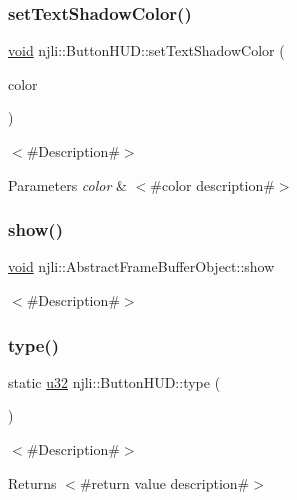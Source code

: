 \subsubsection{\texorpdfstring{set\+Text\+Shadow\+Color()}{setTextShadowColor()}}
{\footnotesize\ttfamily \mbox{\hyperlink{_thread_8h_af1e856da2e658414cb2456cb6f7ebc66}{void}} njli\+::\+Button\+H\+U\+D\+::set\+Text\+Shadow\+Color (\begin{DoxyParamCaption}\item[{const bt\+Vector4 \&}]{color }\end{DoxyParamCaption})}

$<$\#\+Description\#$>$


\begin{DoxyParams}{Parameters}
{\em color} & $<$\#color description\#$>$ \\
\hline
\end{DoxyParams}
\mbox{\label{classnjli_1_1_button_h_u_d_a73ffd499fceaacd59b518a541ed2133e}} 
\subsubsection{\texorpdfstring{show()}{show()}}
{\footnotesize\ttfamily \mbox{\hyperlink{_thread_8h_af1e856da2e658414cb2456cb6f7ebc66}{void}} njli\+::\+Abstract\+Frame\+Buffer\+Object\+::show}

$<$\#\+Description\#$>$ \mbox{\label{classnjli_1_1_button_h_u_d_ad2c1e7f0adb647dea2f8fd6b2b77dd9a}} 
\subsubsection{\texorpdfstring{type()}{type()}}
{\footnotesize\ttfamily static \mbox{\hyperlink{_util_8h_a10e94b422ef0c20dcdec20d31a1f5049}{u32}} njli\+::\+Button\+H\+U\+D\+::type (\begin{DoxyParamCaption}{ }\end{DoxyParamCaption})\hspace{0.3cm}{\ttfamily [static]}}

$<$\#\+Description\#$>$

\begin{DoxyReturn}{Returns}
$<$\#return value description\#$>$ 
\end{DoxyReturn}


